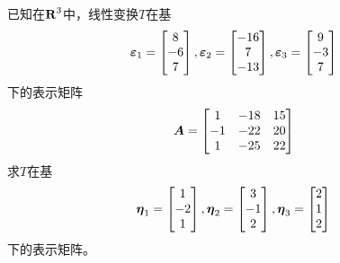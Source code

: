 \setcounter{problem}{30}
\begin{problem}
已知在\(\boldsymbol{\mathrm{R}}^3\)中，线性变换\(T\)在基
\begin{equation*}
    \boldsymbol{\varepsilon}_1=\begin{bmatrix}8\\-6\\7\end{bmatrix},
    \boldsymbol{\varepsilon}_2=\begin{bmatrix}-16\\7\\-13\end{bmatrix},
    \boldsymbol{\varepsilon}_3=\begin{bmatrix}9\\-3\\7\end{bmatrix}
\end{equation*}
下的表示矩阵
\begin{equation*}
    \boldsymbol{A}=
    \begin{bmatrix}
        1  & -18 & 15 \\
        -1 & -22 & 20 \\
        1  & -25 & 22
    \end{bmatrix}
\end{equation*}
求\(T\)在基
\begin{equation*}
    \boldsymbol{\eta}_1=\begin{bmatrix}1\\-2\\1\end{bmatrix},
    \boldsymbol{\eta}_2=\begin{bmatrix}3\\-1\\2\end{bmatrix},
    \boldsymbol{\eta}_3=\begin{bmatrix}2\\1\\2\end{bmatrix}
\end{equation*}
下的表示矩阵。
\end{problem}

